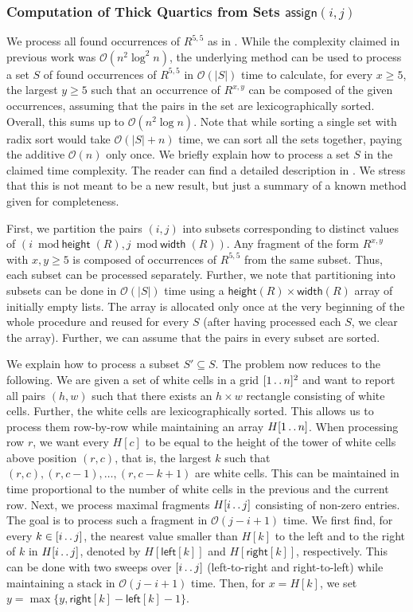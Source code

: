 \documentclass[11pt,letterpaper]{article}
\newcommand{\cO}{\mathcal{O}}
\newcommand{\width}{\textsf{width}}
\newcommand{\height}{\textsf{height}}
\def\dd{\mathinner{.\,.}}
\newcommand{\assign}{\textsf{assign}}
\begin{document}
\subsubsection{Computation of Thick Quartics from Sets $\assign(i,j)$}
We process all found occurrences of $R^{5,5}$ as in \cite[Section 5]{CRRWZ}. While the complexity claimed
in previous work was $\cO(n^{2}\log^2 n)$, the underlying method can be used to process a set $S$ of found
occurrences of $R^{5,5}$ in $\cO(|S|)$ time to calculate, for every $x\geq 5$, the largest $y\geq 5$
such that an occurrence of $R^{x,y}$ can be composed of the given occurrences,
assuming that the pairs in the set are lexicographically sorted.
Overall, this sums up to $\cO(n^{2}\log n)$.
Note that while sorting a single set with radix sort would take $\cO(|S|+n)$ time, we can sort all the sets
together, paying the additive $\cO(n)$ only once.
We briefly explain how to process a set $S$ in the claimed time complexity. The reader can find a detailed
description in \cite[Section 5]{CRRWZ}. We stress that this is not meant to be a new result, but just
a summary of a known method given for completeness.

First, we partition the pairs $(i,j)$ into subsets corresponding to distinct values of $(i\bmod \height(R),j\bmod \width(R))$. Any fragment
of the form $R^{x,y}$ with $x,y\geq 5$ is composed of occurrences of $R^{5,5}$ from the same subset.
Thus, each subset can be processed separately. Further, we note that partitioning into subsets can be done
in $\cO(|S|)$ time using a $\height(R)\times \width(R)$ array of initially empty lists. The array is allocated only
once at the very beginning of the whole procedure and reused for every $S$ (after having processed each $S$, we clear the array).
Further, we can assume that the pairs in every subset are sorted.

We explain how to process a subset $S'\subseteq S$. The problem now reduces to the following.
We are given a set of white cells in a grid $[1 \dd n]^{2}$ and want to report all pairs $(h,w)$ such that
there exists an $h\times w$ rectangle consisting of white cells. Further, the white cells are lexicographically
sorted. This allows us to process them row-by-row while maintaining an array $H[1\dd n]$. When processing
row $r$, we want every $H[c]$ to be equal to the height of the tower of white cells above position $(r,c)$,
that is, the largest $k$ such that $(r,c),(r,c-1),\ldots,(r,c-k+1)$ are white cells. This can be maintained
in time proportional to the number of white cells in the previous and the current row.
Next, we process maximal fragments $H[i\dd j]$ consisting of non-zero entries. The goal is to process such
a fragment in $\cO(j-i+1)$ time. We first find, for every $k\in [i\dd j]$, the nearest value smaller than $H[k]$ to the left
and to the right of $k$ in $H[i\dd j]$, denoted by $H[\textsf{left}[k]]$ and $H[\textsf{right}[k]]$, respectively.
This can be done with two sweeps over $[i \dd j]$ (left-to-right and right-to-left)
while maintaining a stack in $\cO(j-i+1)$ time. Then, for $x=H[k]$, we set $y=\max\{y, \textsf{right}[k]-\textsf{left}[k]-1\}$.
\end{document}
